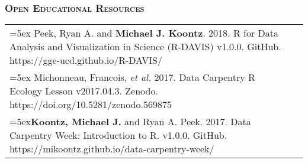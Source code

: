 \documentclass[10pt,english]{article}
\providecommand{\tabularnewline}{\\}
\begin{document}
\vspace{1ex}

\subsubsection*{\textsc{Open Educational Resources}}
\vspace{-0.5ex}

\renewcommand{\arraystretch}{1.2}
\begin{tabularx}{\textwidth}{@{}>{\raggedright}p{5.25in} >{\raggedleft}X@{}}
\hangindent=5ex Peek, Ryan A. and \textbf{Michael J. Koontz}. 2018. R for Data Analysis and Visualization in Science (R-DAVIS) v1.0.0. GitHub. https://gge-ucd.github.io/R-DAVIS/ & 2018 \tabularnewline

\hangindent=5ex Michonneau, Francois, \emph{et al.} 2017. Data Carpentry R Ecology Lesson v2017.04.3. Zenodo. https://doi.org/10.5281/zenodo.569875 & 2017 \tabularnewline

\hangindent=5ex\textbf{Koontz, Michael J.} and Ryan A. Peek. 2017. Data Carpentry Week: Introduction to R. v1.0.0. GitHub. https://mikoontz.github.io/data-carpentry-week/ & 2017 \tabularnewline

\end{tabularx}
\end{document}
